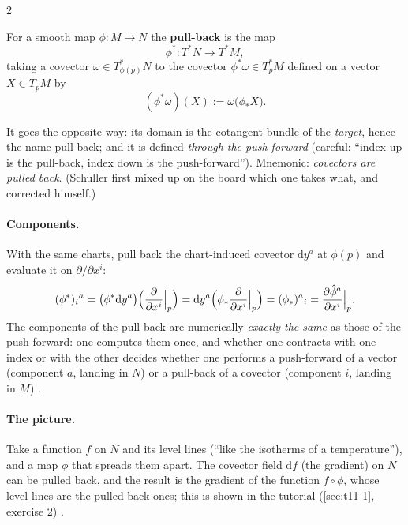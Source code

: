 \begin{paracol}{2}
\begin{definition}\label{def:c11-pull}
For a smooth map $\phi\colon M\to N$ the \textbf{pull-back} is the map
\[
  \phi^*\colon T^*N\to T^*M,
\]
taking a covector $\omega\in T^*_{\phi(p)}N$ to the covector $\phi^*\omega\in T^*_pM$ defined on a vector $X\in T_pM$ by
\[
  (\phi^*\omega)(X):=\omega\bigl(\phi_*X\bigr).
\]
\end{definition}
It goes the opposite way: its domain is the cotangent bundle of the \emph{target}, hence the name pull-back; and it is defined \emph{through the push-forward} (careful: ``index up is the pull-back, index down is the push-forward''). Mnemonic: \emph{covectors are pulled back}. (Schuller first mixed up on the board which one takes what, and corrected himself.)

\paragraph{Components.} With the same charts, pull back the chart-induced covector $\mathrm dy^a$ at $\phi(p)$ and evaluate it on $\partial/\partial x^i$:
\[
  (\phi^*)_i{}^a=\bigl(\phi^*\mathrm dy^a\bigr)\Bigl(\frac{\partial}{\partial x^i}\Big|_p\Bigr)=\mathrm dy^a\Bigl(\phi_*\frac{\partial}{\partial x^i}\Big|_p\Bigr)=(\phi_*)^a{}_i=\frac{\partial\hat\phi^a}{\partial x^i}\Big|_p.
\]
The components of the pull-back are numerically \emph{exactly the same} as those of the push-forward: one computes them once, and whether one contracts with one index or with the other decides whether one performs a push-forward of a vector (component $a$, landing in $N$) or a pull-back of a covector (component $i$, landing in $M$) .

\paragraph{The picture.} Take a function $f$ on $N$ and its level lines (``like the isotherms of a temperature''), and a map $\phi$ that spreads them apart. The covector field $\mathrm df$ (the gradient) on $N$ can be pulled back, and the result is the gradient of the function $f\circ\phi$, whose level lines are the pulled-back ones; this is shown in the tutorial (\cref{sec:t11-1}, exercise 2) .


\end{paracol}
